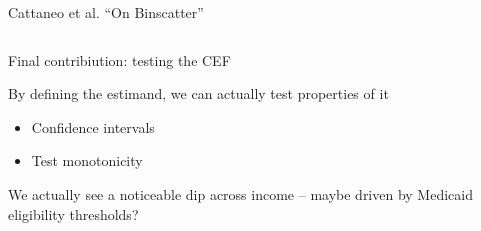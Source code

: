 \documentclass[notes,11pt, aspectratio=169]{beamer}
\newenvironment{wideitemize}{\itemize\addtolength{\itemsep}{10pt}}{\enditemize}
\begin{document}
\begin{frame}{Cattaneo et al. ``On Binscatter''}
  \begin{columns}[T] %
    \begin{column}{.5\textwidth}
      \begin{wideitemize}
      \item Final contribiution: testing the CEF
      \item By defining the estimand, we can actually test properties
        of it
        \begin{itemize}
        \item Confidence intervals
        \item Test monotonicity
        \end{itemize}
      \item We actually see a noticeable dip across income -- maybe
        driven by Medicaid eligibility thresholds?
  \end{wideitemize}
  \end{column}%
  \hfill%
  \begin{column}{.5\textwidth}
\end{column}
\end{columns}
\end{frame}
\end{document}
